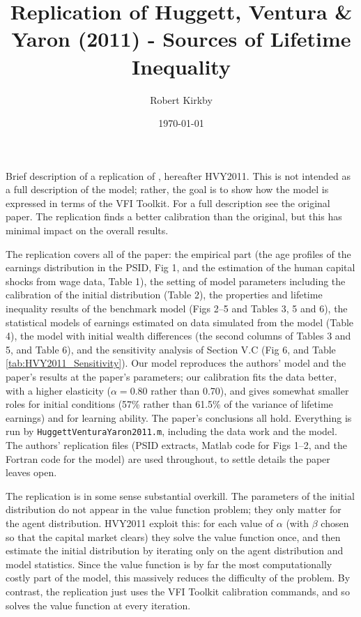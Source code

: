 \documentclass[11pt,fleqn]{article}
\begin{document}
\newcommand{\rob}[1]{{\noindent\color{blue}\bf #1}}
\newcommand{\robc}[1]{{\noindent\color{blue}\bf R: #1}}

\title{Replication of Huggett, Ventura \& Yaron (2011) - Sources of Lifetime Inequality}
\author{Robert Kirkby}
\date{\today}
\maketitle

Brief description of a replication of \cite*{HuggettVenturaYaron2011}, hereafter HVY2011. This is not intended as a full description of the model; rather, the goal is to show how the model is expressed in terms of the VFI Toolkit. For a full description see the original paper. The replication finds a better calibration than the original, but this has minimal impact on the overall results.

The replication covers all of the paper: the empirical part (the age profiles of the earnings distribution in the PSID, Fig 1, and the estimation of the human capital shocks from wage data, Table 1), the setting of model parameters including the calibration of the initial distribution (Table 2), the properties and lifetime inequality results of the benchmark model (Figs 2--5 and Tables 3, 5 and 6), the statistical models of earnings estimated on data simulated from the model (Table 4), the model with initial wealth differences (the second columns of Tables 3 and 5, and Table 6), and the sensitivity analysis of Section V.C (Fig 6, and Table \ref{tab:HVY2011_Sensitivity}). Our model reproduces the authors' model and the paper's results at the paper's parameters; our calibration fits the data better, with a higher elasticity ($\alpha=0.80$ rather than 0.70), and gives somewhat smaller roles for initial conditions (57\% rather than 61.5\% of the variance of lifetime earnings) and for learning ability. The paper's conclusions all hold. Everything is run by \verb|HuggettVenturaYaron2011.m|, including the data work and the model. The authors' replication files (PSID extracts, Matlab code for Figs 1--2, and the Fortran code for the model) are used throughout, to settle details the paper leaves open.

The replication is in some sense substantial overkill. The parameters of the initial distribution do not appear in the value function problem; they only matter for the agent distribution. HVY2011 exploit this: for each value of $\alpha$ (with $\beta$ chosen so that the capital market clears) they solve the value function once, and then estimate the initial distribution by iterating only on the agent distribution and model statistics. Since the value function is by far the most computationally costly part of the model, this massively reduces the difficulty of the problem. By contrast, the replication just uses the VFI Toolkit calibration commands, and so solves the value function at every iteration.
\end{document}
